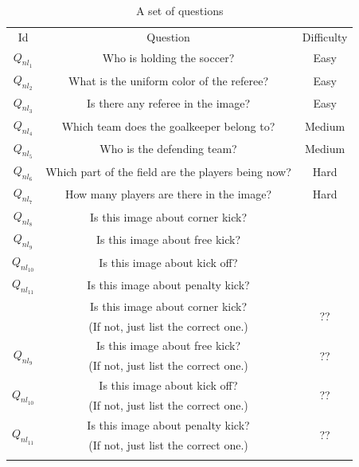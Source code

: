 \begin{table}[thb]
	\renewcommand{\arraystretch}{1}
	\begin{center}
		\footnotesize		
		\begin{tabular}{c|c|c}
			\Xhline{1pt}
			Id & Question                                           & Difficulty \\ \Xhline{0.7pt}
			$Q_{nl_1}$  & Who is holding the soccer?                         & Easy       \\ \hline
			$Q_{nl_2}$  & What is the uniform color of the referee?           & Easy       \\ \hline
			$Q_{nl_3}$  & Is there any referee in the image?                 & Easy       \\ \hline
			$Q_{nl_4}$  & Which team does the goalkeeper belong to?          & Medium       \\ \hline
			$Q_{nl_5}$  & Who is the defending team?                         & Medium       \\ \hline
			$Q_{nl_6}$  & Which part of the field are the players being now? & Hard       \\ \hline
			$Q_{nl_7}$  & How many players are there in the image?           & Hard     \\ \hline
			$Q_{nl_8}$  & Is this image about corner kick?                   & 
			\\ \hline
			$Q_{nl_9}$  & Is this image about free kick?                     & 
			\\ \hline
			$Q_{nl_{10}}$  & Is this image about kick off?                  & 
			\\ \hline
			$Q_{nl_{11}}$  &  Is this image about penalty kick?             &
			\\ \hline
			\eat{
			\multirow{2}{*}{$Q_{nl_8}$ }
			& Is this image about corner kick?           &  \multirow{2}{*}{\color{red}??}  \\ 
			& {\color{red}(If not, just list the correct one.)}  & \\ \hline
			
			\multirow{2}{*}{$Q_{nl_{9}}$}  &  Is this image about free kick?  &  \multirow{2}{*}{\color{red}??}    \\ 
			& {\color{red}(If not, just list the correct one.)}  &  \\ \hline
			
			\multirow{2}{*}{$Q_{nl_{10}}$}  &  Is this image about kick off?  &  \multirow{2}{*}{\color{red}??}    \\ 
			& {\color{red}(If not, just list the correct one.)}  &  \\ \hline
			
			\multirow{2}{*}{$Q_{nl_{11}}$}  &   Is this image about penalty kick?  &  \multirow{2}{*}{\color{red}??}    \\ 
			& {\color{red}(If not, just list the correct one.)}  &  \\ %
			\Xhline{1pt}
			}
		\end{tabular}
		\caption{A set of questions}
		\label{table:questions}
	\end{center}
\end{table}
